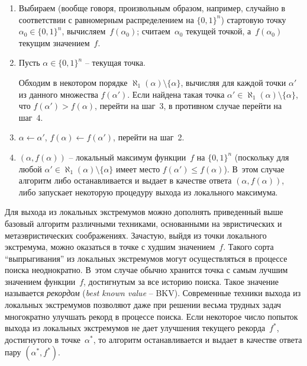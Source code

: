 \begin{enumerate}
    \item Выбираем (вообще говоря, произвольным образом, например, случайно в соответствии с равномерным распределением на $\{ 0,1 \}^{n}$) стартовую точку~$\alpha_{0} \in \{ 0,1 \}^{n}$, вычисляем~$f(\alpha_{0})$; считаем~$\alpha_{0}$ текущей точкой, а~$f(\alpha_{0})$ текущим значением~$f$.

    \item Пусть $\alpha \in \{ 0,1 \}^{n}$ \--- текущая точка.

    Обходим в некотором порядке $\aleph_{1}(\alpha) \setminus \{ \alpha \}$, вычисляя для каждой точки $\alpha'$ из данного множества $f(\alpha')$.
    Если найдена такая точка $\alpha' \in \aleph_{1}(\alpha) \setminus \{ \alpha \}$, что $f(\alpha') > f(\alpha)$, перейти на шаг~3, в противном случае перейти на шаг~4.

    \item $\alpha \gets \alpha'$, $f(\alpha) \gets f(\alpha')$, перейти на шаг~2.

    \item $(\alpha,f(\alpha))$ \--- локальный максимум функции~$f$ на $\{ 0,1 \}^{n}$ (поскольку для любой $\alpha' \in \aleph_{1}(\alpha) \setminus \{\alpha\}$ имеет место $f(\alpha') \leq f(\alpha)$).
    В~этом случае алгоритм либо останавливается и выдает в качестве ответа $(\alpha, f(\alpha))$, либо запускает некоторую процедуру выхода из локального максимума.
\end{enumerate}

Для выхода из локальных экстремумов можно дополнять приведенный выше базовый алгоритм различными техниками, основанными на эвристических и метаэвристических соображениях.
Зачастую, выйдя из точки локального экстремума, можно оказаться в точке с худшим значением~$f$.
Такого сорта \enquote{выпрыгивания} из локальных экстремумов могут осуществляться в процессе поиска неоднократно.
В~этом случае обычно хранится точка с самым лучшим значением функции~$f$, достигнутым за все историю поиска.
Такое значение называется \textit{рекордом} (\textit{best known value} \--- BKV).
Современные техники выхода из локальных экстремумов позволяют даже при решении весьма трудных задач многократно улучшать рекорд в процессе поиска.
Если некоторое число попыток выхода из локальных экстремумов не дает улучшения текущего рекорда~$f^{*}$, достигнутого в точке~$\alpha^{*}$, то алгоритм останавливается и выдает в качестве ответа пару $(\alpha^{*}, f^{*})$.

